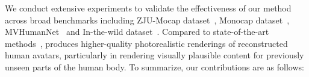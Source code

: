 We conduct extensive experiments to validate the effectiveness of our method across broad benchmarks including ZJU-Mocap dataset~\cite{peng2021neural}, Monocap dataset~\cite{peng2024animatable}, MVHumanNet~\cite{xiong2024mvhumannet} and In-the-wild dataset~\cite{zhou2019dance}. 
Compared to state-of-the-art methods~\cite{weng2022humannerf,instant_nvr,shao2024splattingavatar,moon2024exavatar,lee2024gtu}, \name produces higher-quality photorealistic renderings of reconstructed human avatars, particularly in rendering visually plausible content for previously unseen parts of the human body. To summarize, our contributions are as follows:







